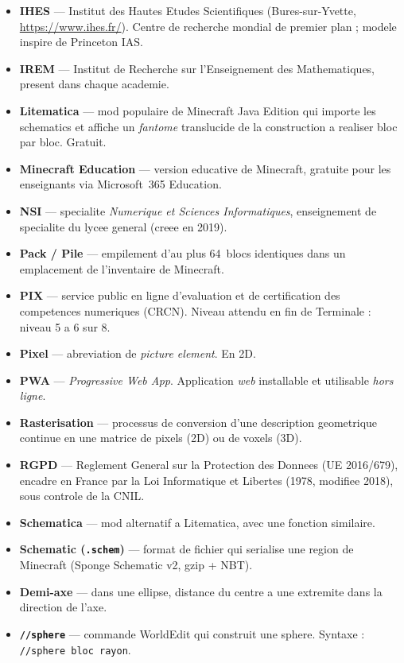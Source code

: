\documentclass[12pt,a4paper]{scrartcl}
\newcommand{\code}[1]{\texttt{\small #1}}
\newcommand{\acc}[1]{\textcolor{accent}{\textbf{#1}}}
\newcommand{\cmd}[1]{\textcolor{earth}{\texttt{\small #1}}}
\begin{document}
\begin{itemize}[leftmargin=1.4em,itemsep=0.3em,topsep=0.3em]
  \item \acc{IHES} --- Institut des Hautes Etudes Scientifiques (Bures-sur-Yvette, \url{https://www.ihes.fr/}). Centre de recherche mondial de premier plan ; modele inspire de Princeton IAS.
  \item \acc{IREM} --- Institut de Recherche sur l'Enseignement des Mathematiques, present dans chaque academie.
  \item \acc{Litematica} --- mod populaire de Minecraft Java Edition qui importe les schematics et affiche un \emph{fantome} translucide de la construction a realiser bloc par bloc. Gratuit.
  \item \acc{Minecraft Education} --- version educative de Minecraft, gratuite pour les enseignants via Microsoft~365 Education.
  \item \acc{NSI} --- specialite \emph{Numerique et Sciences Informatiques}, enseignement de specialite du lycee general (creee en 2019).
  \item \acc{Pack / Pile} --- empilement d'au plus 64~blocs identiques dans un emplacement de l'inventaire de Minecraft.
  \item \acc{PIX} --- service public en ligne d'evaluation et de certification des competences numeriques (CRCN). Niveau attendu en fin de Terminale : niveau 5 a 6 sur 8.
  \item \acc{Pixel} --- abreviation de \emph{picture element}. En 2D.
  \item \acc{PWA} --- \emph{Progressive Web App}. Application \emph{web} installable et utilisable \emph{hors ligne}.
  \item \acc{Rasterisation} --- processus de conversion d'une description geometrique continue en une matrice de pixels (2D) ou de voxels (3D).
  \item \acc{RGPD} --- Reglement General sur la Protection des Donnees (UE 2016/679), encadre en France par la Loi Informatique et Libertes (1978, modifiee 2018), sous controle de la CNIL.
  \item \acc{Schematica} --- mod alternatif a Litematica, avec une fonction similaire.
  \item \acc{Schematic (\texttt{.schem})} --- format de fichier qui serialise une region de Minecraft (Sponge Schematic v2, gzip + NBT).
  \item \acc{Demi-axe} --- dans une ellipse, distance du centre a une extremite dans la direction de l'axe.
  \item \acc{\code{//sphere}} --- commande WorldEdit qui construit une sphere. Syntaxe : \cmd{//sphere bloc rayon}.

\end{itemize}
\end{document}
